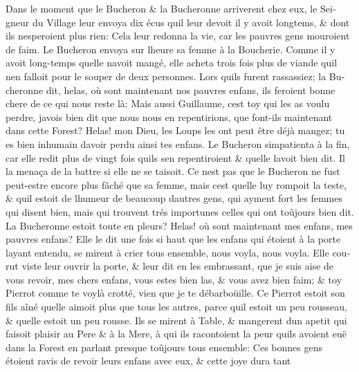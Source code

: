 \documentclass[14pt,a4paper]{memoir}
\begin{document}
{{\begin{otherlanguage}{french}
Dans le moment que le Bucheron \& la Bucheronne arriverent chez eux, le
Seigneur du Village leur envoya dix écus qu\textquotesingle il leur
devoit il y avoit longtems, \& dont ils n\textquotesingle esperoient
plus rien: Cela leur redonna la vie, car les pauvres gens mouroient de
faim. Le Bucheron envoya sur l\textquotesingle heure sa femme à la
Boucherie. Comme il y avoit long-temps qu\textquotesingle elle
n\textquotesingle avoit mangé, elle acheta trois fois plus de viande
qu\textquotesingle il n\textquotesingle en falloit pour le souper de
deux personnes. Lors qu\textquotesingle ils furent rassassiez; la
Bucheronne dit, helas, où sont maintenant nos pauvres enfans, ils
feroient bonne chere de ce qui nous reste là: Mais aussi Guillaume,
c\textquotesingle est toy qui les as voulu perdre,
j\textquotesingle avois bien dit que nous nous en repentirions, que
font-ils maintenant dans cette Forest? Helas! mon Dieu, les Loups les
ont peut être déjà mangez; tu es bien inhumain d\textquotesingle avoir
perdu ainsi tes enfans. Le Bucheron s\textquotesingle impatienta à la
fin, car elle redit plus de vingt fois qu\textquotesingle ils
s\textquotesingle en repentiroient \& qu\textquotesingle elle
l\textquotesingle avoit bien dit. Il la menaça de la battre si elle ne
se taisoit. Ce n\textquotesingle est pas que le Bucheron ne fust
peut-estre encore plus fâché que sa femme, mais c\textquotesingle est
qu\textquotesingle elle luy rompoit la teste, \& qu\textquotesingle il
estoit de l\textquotesingle humeur de beaucoup d\textquotesingle autres
gens, qui ayment fort les femmes qui disent bien, mais qui trouvent trés
importunes celles qui ont toûjours bien dit. La Bucheronne estoit toute
en pleurs? Helas! où sont maintenant mes enfans, mes pauvres enfans?
Elle le dit une fois si haut que les enfans qui étoient à la porte
l\textquotesingle ayant entendu, se mirent à crier tous ensemble, nous
voyla, nous voyla. Elle courut viste leur ouvrir la porte, \& leur dit
en les embrassant, que je suis aise de vous revoir, mes chers enfans,
vous estes bien las, \& vous avez bien faim; \& toy Pierrot comme te
voylà crotté, vien que je te débarboüille. Ce Pierrot estoit son fils
aîné qu\textquotesingle elle aimoit plus que tous les autres, parce
qu\textquotesingle il estoit un peu rousseau, \& qu\textquotesingle elle
estoit un peu rousse. Ils se mirent à Table, \& mangerent
d\textquotesingle un apetit qui faisoit plaisir au Pere \& à la Mere, à
qui ils racontoient la peur qu\textquotesingle ils avoient euë dans la
Forest en parlant presque toûjours tous ensemble: Ces bonnes gens
étoient ravis de revoir leurs enfans avec eux, \& cette joye dura tant

\end{otherlanguage}}}
\end{document}
